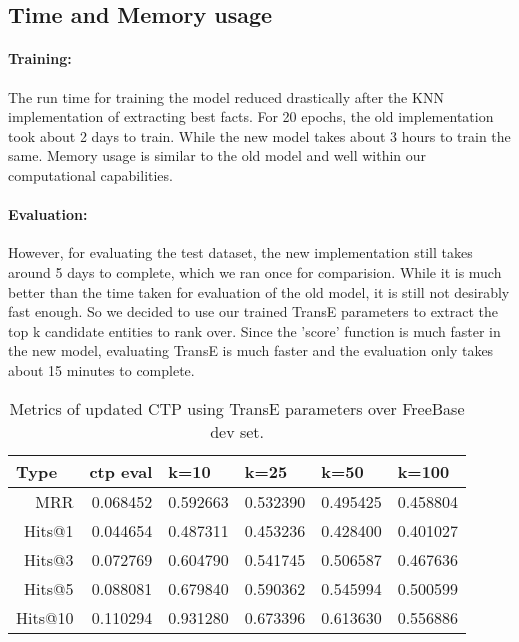 \documentclass[Other]{iitddiss}
\begin{document}
\subsection{Time and Memory usage}
\paragraph{Training:}
The run time for training the model reduced drastically after the KNN implementation of extracting best facts. For 20 epochs, the old implementation took about 2 days to train. While the new model takes about 3 hours to train the same. Memory usage is similar to the old model and well within our computational capabilities.

\paragraph{Evaluation:}
However, for evaluating the test dataset, the new implementation still takes around 5 days to complete, which we ran once for comparision. While it is much better than the time taken for evaluation of the old model, it is still not desirably fast enough. So we decided to use our trained TransE parameters to extract the top k candidate entities to rank over. Since the 'score' function is much faster in the new model, evaluating TransE is much faster and the evaluation only takes about 15 minutes to complete.

\begin{table}[H]
	\centering
	\begin{tabular}{|r|r|r|r|r|r|}
		\hline
		\multicolumn{1}{|l|}{\textbf{Type}} & \multicolumn{1}{l|}{\textbf{ctp eval}} & \multicolumn{1}{l|}{\textbf{k=10}} & \multicolumn{1}{l|}{\textbf{k=25}} & \multicolumn{1}{l|}{\textbf{k=50}} & \multicolumn{1}{l|}{\textbf{k=100}} \\ \hline
		MRR		& 0.068452                                    & 0.592663    & 0.532390      	&0.495425  & 0.458804                              \\ \hline
		Hits@1	& 0.044654                                    & 0.487311	& 0.453236		&0.428400  & 0.401027                                   \\ \hline
		Hits@3	& 0.072769                                    & 0.604790	& 0.541745		&0.506587  & 0.467636                                   \\ \hline
		Hits@5	& 0.088081                                    & 0.679840	& 0.590362		&0.545994  & 0.500599                                    \\ \hline
		Hits@10	& 0.110294                                    & 0.931280	& 0.673396	&0.613630  & 0.556886                                  \\ \hline
	\end{tabular}
	\caption{Metrics of updated CTP using TransE parameters over FreeBase dev set. }
	\label{tab:transE_MRR}
\end{table}
\end{document}
